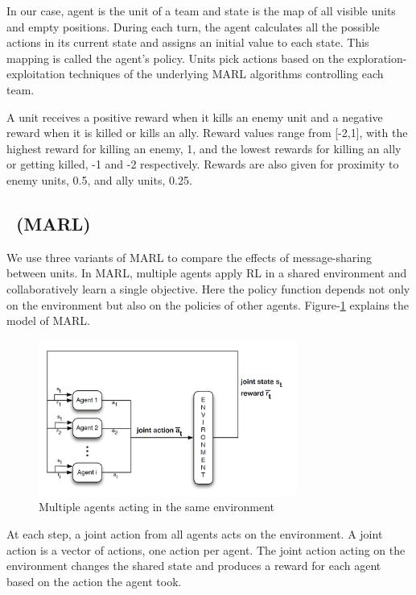 In our case, agent is the unit of a team and state is the map of all visible units and empty positions. During each turn, the agent calculates all the possible actions in its current state and assigns an initial value to each state. This mapping is called the agent's policy. Units pick actions based on the exploration-exploitation techniques of the underlying MARL algorithms controlling each team.

A unit receives a positive reward when it kills an enemy unit and a negative reward when it is killed or kills an ally. Reward values range from [-2,1], with the highest reward for killing an enemy, 1, and the lowest rewards for killing an ally or getting killed, -1 and -2 respectively. Rewards are also given for proximity to enemy units, 0.5, and ally units, 0.25.

\subsection{\MARL\ (MARL)}\label{MARL}
We use three variants of MARL to compare the effects of message-sharing between units. In MARL, multiple agents apply RL in a shared environment and collaboratively learn a single objective. Here the policy function depends not only on the environment but also on the policies of other agents. Figure-\ref{fig:res2} explains the model of MARL.
 
\begin{figure}[htb]

\begin{minipage}[b]{1.0\linewidth}
  \centering
  \centerline{\includegraphics[width=8.5cm]{MARL}}
  
\end{minipage}
\caption{ Multiple agents acting in the same environment~\cite{Nowe12GameTheoryMultiAgentReinforcement}}
\label{fig:res2}
%
\end{figure}

 At each step, a joint action from all agents acts on the environment. A joint action is a vector of actions, one action per agent. The joint action acting on the environment changes the shared state and produces a reward for each agent based on the action the agent took.
 
